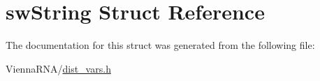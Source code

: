 \hypertarget{structswString}{\section{sw\-String Struct Reference}
\label{structswString}
}


The documentation for this struct was generated from the following file\-:\begin{DoxyCompactItemize}
\item 
Vienna\-R\-N\-A/\hyperlink{dist__vars_8h}{dist\-\_\-vars.\-h}\end{DoxyCompactItemize}
